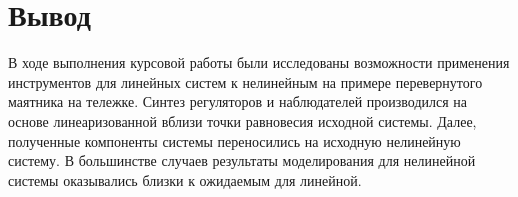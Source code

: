 \chapter{Вывод}
\label{ch:chap6}
В ходе выполнения курсовой работы были исследованы возможности применения инструментов для линейных систем к нелинейным
 на примере перевернутого маятника на тележке. Синтез регуляторов и наблюдателей производился на основе линеаризованной вблизи точки равновесия исходной системы. Далее, полученные компоненты системы переносились на исходную нелинейную систему. В большинстве случаев результаты моделирования для нелинейной системы оказывались близки к ожидаемым для линейной. 




\endinput